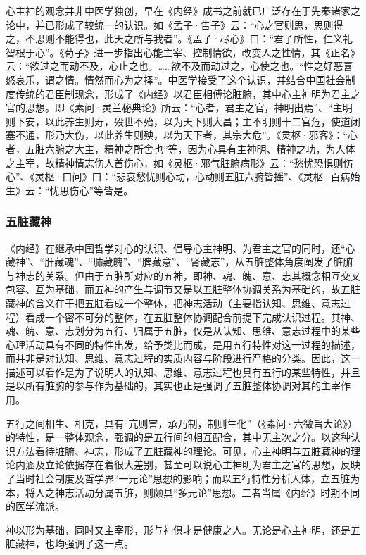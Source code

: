 \documentclass[12pt]{ctexbook}
\begin{document}
心主神的观念并非中医学独创，早在《内经》成书之前就已广泛存在于先秦诸家之论中，并已形成了较统一的认识。如《孟子·告子》云：“心之官则思，思则得之，不思则不能得也，此天之所与我者”。《孟子·尽心》曰：“君子所性，仁义礼智根于心”。《荀子》进一步指出心能主宰、控制情欲，改变人之性情，其《正名》云：“欲过之而动不及，心止之也。……欲不及而动过之，心使之也。”“性之好恶喜怒哀乐，谓之情。情然而心为之择”。中医学接受了这个认识，并结合中国社会制度传统的君臣制现念，形成了《内经》以君臣相傅论脏腑，其中心主神明为君主之官的思想。即《素问·灵兰秘典论》所云：“心者，君主之官，神明出焉”、“主明则下安，以此养生则寿，殁世不殆，以为天下则大昌；主不明则十二官危，使道闭塞不通，形乃大伤，以此养生则殃，以为天下者，其宗大危”。《灵枢·邪客》：“心者，五脏六腑之大主，精神之所舍也”等，因为心具有主神明、精神之功，为人体之主宰，故精神情志伤人首伤心，如《灵枢·邪气脏腑病形》云：“愁忧恐惧则伤心”、《灵枢·口问》曰：“悲哀愁忧则心动，心动则五脏六腑皆摇”、《灵枢·百病始生》云：“忧思伤心”等皆是。

\subsubsection{五脏藏神}%

《内经》在继承中国哲学对心的认识、倡导心主神明、为君主之官的同时，还“心藏神”、“肝藏魂”、“肺藏魄”、“脾藏意”、“肾藏志”，从五脏整体角度阐发了脏腑与神志的关系。但由于五脏所对应的五神，即神、魂、魄、意、志其概念相互交叉包容、互为基础，而五神的产生与调节又是以五脏整体协调关系为基础的，故五脏藏神的含义在于把五脏看成一个整体，把神志活动（主要指认知、思维、意志过程）看成一个密不可分的整体，在五脏整体协调配合前提下完成认识过程。其神、魂、魄、意、志划分为五行、归属于五脏，仅是从认知、思维、意志过程中的某些心理活动具有不同的特性出发，给予类比而成，是用五行特性对这一过程的描述，而并非是对认知、思维、意志过程的实质内容与阶段进行严格的分类。因此，这一描述可以看作是为了说明人的认知、思维、意志过程也具有五行的某些特性，并且是以所有脏腑的参与作为基础的，其实也正是强调了五脏整体协调对其的主宰作用。

五行之间相生、相克，具有“亢则害，承乃制，制则生化”（《素问·六微旨大论》）的特性，是一整体观念，强调的是五行间的相互配合，其中无主次之分。以这种认识方法看待脏腑、神志，形成了五脏藏神的理论。可见，心主神明与五脏藏神的理论内涵及立论依据存在着很大差别，甚至可以说心主神明为君主之官的思想，反映了当时社会制度及哲学界“一元论”思想的影响；而以五行特性分析人体，立五脏为本，将人之神志活动分属五脏，则颇具“多元论”思想。二者当属《内经》时期不同的医学流派。

神以形为基础，同时又主宰形，形与神俱才是健康之人。无论是心主神明，还是五脏藏神，也均强调了这一点。
\end{document}
